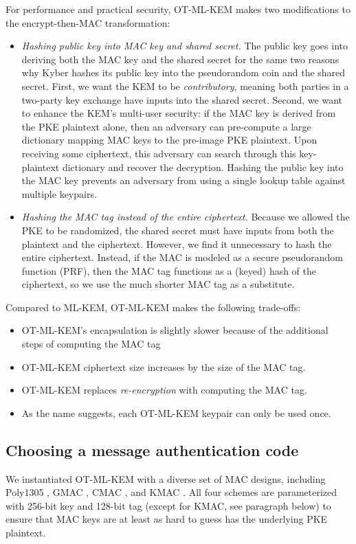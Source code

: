 \documentclass[letterpaper,12pt,titlepage,oneside,final]{book}
\begin{document}
For performance and practical security, OT-ML-KEM makes two modifications to the encrypt-then-MAC transformation: \begin{itemize}
    \item \emph{Hashing public key into MAC key and shared secret.} The public key goes into deriving both the MAC key and the shared secret for the same two reasons why Kyber \cite{DBLP:conf/eurosp/BosDKLLSSSS18} hashes its public key into the pseudorandom coin and the shared secret. 
    First, we want the KEM to be \textit{contributory}, meaning both parties in a two-party key exchange have inputs into the shared secret.
    Second, we want to enhance the KEM's multi-user security: if the MAC key is derived from the PKE plaintext alone, then an adversary can pre-compute a large dictionary mapping MAC keys to the pre-image PKE plaintext.
    Upon receiving some ciphertext, this adversary can search through this key-plaintext dictionary and recover the decryption.
    Hashing the public key into the MAC key prevents an adversary from using a single lookup table against multiple keypairs.
    \item \emph{Hashing the MAC tag instead of the entire ciphertext.} Because we allowed the PKE to be randomized, the shared secret must have inputs from both the plaintext and the ciphertext. However, we find it unnecessary to hash the entire ciphertext.
    Instead, if the MAC is modeled as a secure pseudorandom function (PRF), then the MAC tag functions as a (keyed) hash of the ciphertext, so we use the much shorter MAC tag as a substitute.
\end{itemize}

Compared to ML-KEM, OT-ML-KEM makes the following trade-offs: \begin{itemize}
    \item OT-ML-KEM's encapsulation is slightly slower because of the additional steps of computing the MAC tag
    \item OT-ML-KEM ciphertext size increases by the size of the MAC tag.
    \item OT-ML-KEM replaces \textit{re-encryption} with computing the MAC tag.
    \item As the name suggests, each OT-ML-KEM keypair can only be used once.
\end{itemize}

\subsection{Choosing a message authentication code}\label{sec:choosing-a-mac}
We instantiated OT-ML-KEM with a diverse set of MAC designs, including Poly1305 \cite{DBLP:conf/fse/Bernstein05}, GMAC \cite{mcgrew2004galois}, CMAC \cite{black2000cbc,iwata2003omac}, and KMAC \cite{SP80053r4}.
All four schemes are parameterized with 256-bit key and 128-bit tag (except for KMAC, see paragraph below) to ensure that MAC keys are at least as hard to guess has the underlying PKE plaintext.
\end{document}
